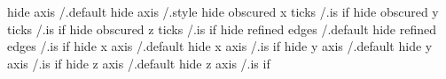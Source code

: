 hide axis             /.default
hide axis             /.style
hide obscured x ticks /.is if
hide obscured y ticks /.is if
hide obscured z ticks /.is if
hide refined edges    /.default
hide refined edges    /.is if
hide x axis           /.default
hide x axis           /.is if
hide y axis           /.default
hide y axis           /.is if
hide z axis           /.default
hide z axis           /.is if


